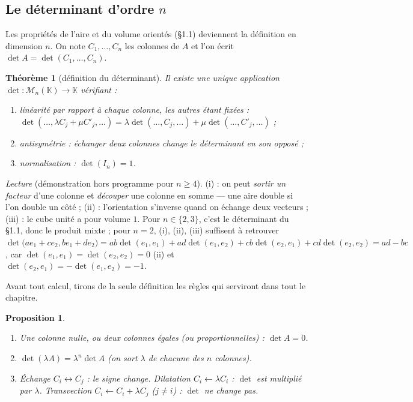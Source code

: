 \documentclass[a4paper,11pt]{article}
\numberwithin{equation}{section}
\numberwithin{figure}{section}
\numberwithin{table}{section}
\theoremstyle{enonce}
\newtheorem{theoreme}[definition]{Théorème}
\newtheorem{proposition}[definition]{Proposition}
\theoremstyle{exemple}
\theoremstyle{remarque}
\newcommand{\K}{\mathbb{K}}
\newcommand{\Mn}[1]{\mathcal{M}_{n}(#1)}
\begin{document}
\subsection{Le déterminant d'ordre $n$}


Les propriétés de l'aire et du volume orientés (§1.1) deviennent la définition en dimension $n$. On note
$C_1,\dots,C_n$ les colonnes de $A$ et l'on écrit $\det A=\det(C_1,\dots,C_n)$.

\begin{theoreme}[définition du déterminant]\label{thm:def}
Il existe une unique application $\det:\Mn{\K}\to\K$ vérifiant :
\begin{enumerate}
\item[(i)] \emph{linéarité par rapport à chaque colonne}, les autres étant fixées :
      $\det(\dots,\lambda C_j+\mu C'_j,\dots)=\lambda\det(\dots,C_j,\dots)+\mu\det(\dots,C'_j,\dots)$ ;
\item[(ii)] \emph{antisymétrie} : échanger deux colonnes change le déterminant en son opposé ;
\item[(iii)] \emph{normalisation} : $\det(I_n)=1$.
\end{enumerate}
\end{theoreme}

\emph{Lecture} (démonstration hors programme pour $n\geq4$). (i) : on peut \emph{sortir un facteur} d'une colonne et
\emph{découper} une colonne en somme --- une aire double si l'on double un côté ; (ii) : l'orientation s'inverse quand on
échange deux vecteurs ; (iii) : le cube unité a pour volume $1$. Pour $n\in\{2,3\}$, c'est le déterminant du §1.1, donc le
produit mixte ; pour $n=2$, (i), (ii), (iii) suffisent à retrouver
$\det\big(ae_1+ce_2,be_1+de_2\big)=ab\det(e_1,e_1)+ad\det(e_1,e_2)+cb\det(e_2,e_1)+cd\det(e_2,e_2)=ad-bc$, car $\det(e_1,e_1)=\det(e_2,e_2)=0$ (ii) et $\det(e_2,e_1)=-\det(e_1,e_2)=-1$.

Avant tout calcul, tirons de la seule définition les règles qui serviront dans tout le chapitre.

\begin{proposition}\label{prop:op}
\begin{enumerate}
\item Une colonne nulle, ou deux colonnes égales (ou proportionnelles) : $\det A=0$.
\item $\det(\lambda A)=\lambda^n\det A$ \quad (on sort $\lambda$ de chacune des $n$ colonnes).
\item Échange $C_i\leftrightarrow C_j$ : le signe change. Dilatation $C_i\leftarrow\lambda C_i$ : $\det$ est multiplié
      par $\lambda$. Transvection $C_i\leftarrow C_i+\lambda C_j$ ($j\neq i$) : $\det$ \emph{ne change pas}.
\end{enumerate}
\end{proposition}
\end{document}
